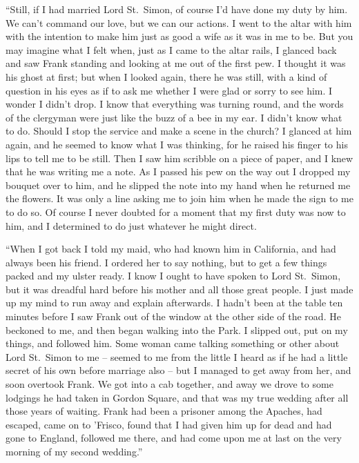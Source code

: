 “Still, if I had married Lord St.~Simon, of course I’d have
done my duty by him. We can’t command our love, but we
can our actions. I went to the altar with him with the intention
to make him just as good a wife as it was in me to be.
But you may imagine what I felt when, just as I came to the
altar rails, I glanced back and saw Frank standing and looking
at me out of the first pew. I thought it was his ghost at
first; but when I looked again, there he was still, with a kind
of question in his eyes as if to ask me whether I were glad or
sorry to see him. I wonder I didn’t drop. I know that everything
was turning round, and the words of the clergyman
were just like the buzz of a bee in my ear. I didn’t know
what to do. Should I stop the service and make a scene in
the church? I glanced at him again, and he seemed to know
what I was thinking, for he raised his finger to his lips to tell
me to be still. Then I saw him scribble on a piece of paper,
and I knew that he was writing me a note. As I passed his
pew on the way out I dropped my bouquet over to him, and
he slipped the note into my hand when he returned me the
flowers. It was only a line asking me to join him when he
made the sign to me to do so. Of course I never doubted
for a moment that my first duty was now to him, and I determined
to do just whatever he might direct.

“When I got back I told my maid, who had known him in
California, and had always been his friend. I ordered her to
say nothing, but to get a few things packed and my ulster
ready. I know I ought to have spoken to Lord St.~Simon, but
it was dreadful hard before his mother and all those great people.
I just made up my mind to run away and explain afterwards.
I hadn’t been at the table ten minutes before I saw
Frank out of the window at the other side of the road. He
beckoned to me, and then began walking into the Park. I
slipped out, put on my things, and followed him. Some woman
came talking something or other about Lord St.~Simon to me -- seemed
to me from the little I heard as if he had a little
secret of his own before marriage also -- but I managed to get
away from her, and soon overtook Frank. We got into a cab
together, and away we drove to some lodgings he had taken
in Gordon Square, and that was my true wedding after all
those years of waiting. Frank had been a prisoner among
the Apaches, had escaped, came on to ’Frisco, found that I
had given him up for dead and had gone to England, followed
me there, and had come upon me at last on the very morning
of my second wedding.”

